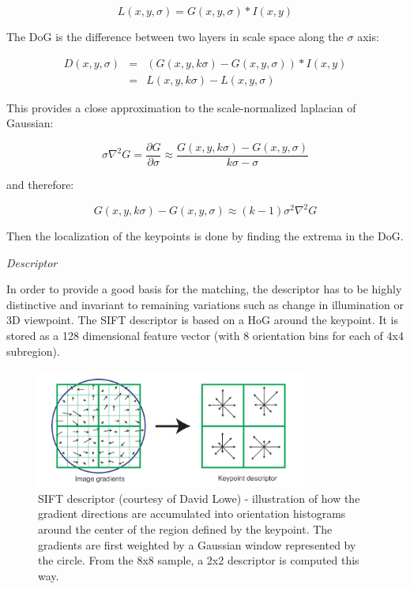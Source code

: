 \[ L(x,y,\sigma) = G(x,y,\sigma) * I(x,y) \]

The \gls{DoG} is the difference between two layers in scale space along the $\sigma$ axis:

\[
\begin{array}{rcl}
D(x,y,\sigma) & = & (G(x,y, k\sigma) - G(x,y,\sigma)) * I(x,y) \\
 & = & L(x,y,k\sigma) - L(x,y,\sigma)
\end{array}
\] 

This provides a close approximation to the scale-normalized laplacian of Gaussian:

\[ \sigma\nabla^2G = \frac{\partial G}{\partial \sigma} \approx \frac{G(x,y,k\sigma)-G(x,y,\sigma)}{k\sigma - \sigma} \]

and therefore:

\[ G(x,y,k\sigma) - G(x,y,\sigma) \approx (k-1)\sigma^2\nabla^2G \]

Then the localization of the keypoints is done by finding the extrema in the \gls{DoG}. 


\emph{Descriptor}

In order to provide a good basis for the matching, the descriptor has to be highly distinctive and invariant to remaining variations such as change in illumination or 3D viewpoint. The \gls{SIFT} descriptor is based on a \gls{HoG} around the keypoint. It is stored as a 128 dimensional feature vector (with 8 orientation bins for each of 4x4 subregion).

\begin{figure}[H]
\centering
\includegraphics[width=0.8\textwidth]{figures/sift_descriptor}
\caption{SIFT descriptor (courtesy of David Lowe) - illustration of how the gradient directions are accumulated into orientation histograms around the center of the region defined by the keypoint. The gradients are first weighted by a Gaussian window represented by the circle. From the 8x8 sample, a 2x2 descriptor is computed this way.}
\end{figure}

